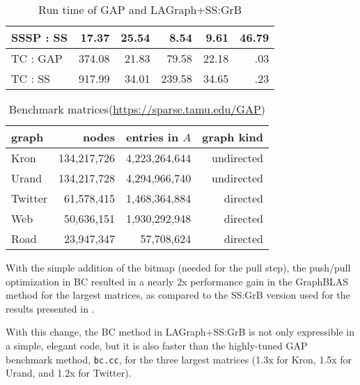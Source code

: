 \begin{table}
\begin{center}
\begin{tabular}{|l|rrrrr|}
SSSP : SS      &  17.37    &  25.54    &   8.54     &  9.61   &   46.79  \\     %
\hline
TC   : GAP     & 374.08    &  21.83    &  79.58     & 22.18   &     .03  \\
TC   : SS      & 917.99    &  34.01    & 239.58     & 34.65   &     .23  \\     %
\hline
\end{tabular}
\caption{Run time of GAP and LAGraph+SS:GrB
\label{table:results}}
\end{center}
\end{table}

\begin{table}
\begin{center}
\begin{tabular}{|l|rrr|}
\hline
graph   & nodes        & entries in $A$ & graph kind \\
\hline
Kron    & 134,217,726 &  4,223,264,644 &  undirected   \\
Urand   & 134,217,728 &  4,294,966,740 &  undirected   \\
Twitter &  61,578,415 &  1,468,364,884 &  directed     \\
Web     &  50,636,151 &  1,930,292,948 &  directed     \\
Road    &  23,947,347 &     57,708,624 &  directed     \\
\hline
\end{tabular}
\caption{Benchmark matrices\label{table:matrices}
(\url{https://sparse.tamu.edu/GAP})}
\end{center}
\end{table}


With the simple addition of the bitmap (needed for the pull step), the
push/pull optimization in BC resulted in a nearly 2x performance gain in the
GraphBLAS method for the largest matrices, as compared to the SS:GrB version
used for the results presented in \cite{DBLP:conf/iiswc/AzadABBCDDDDFGG20}.

With this change, the BC method in LAGraph+SS:GrB is not only expressible in a
simple, elegant code, but it is also faster than the highly-tuned GAP benchmark
method, \verb'bc.cc', for the three largest matrices (1.3x for Kron, 1.5x for
Urand, and 1.2x for Twitter).

